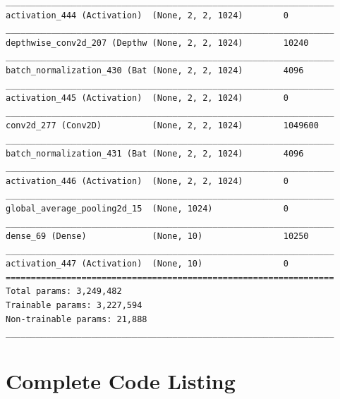 \documentclass{article}
\begin{document}
\begin{appendices}
\begin{lstlisting}
_________________________________________________________________
activation_444 (Activation)  (None, 2, 2, 1024)        0         
_________________________________________________________________
depthwise_conv2d_207 (Depthw (None, 2, 2, 1024)        10240     
_________________________________________________________________
batch_normalization_430 (Bat (None, 2, 2, 1024)        4096      
_________________________________________________________________
activation_445 (Activation)  (None, 2, 2, 1024)        0         
_________________________________________________________________
conv2d_277 (Conv2D)          (None, 2, 2, 1024)        1049600   
_________________________________________________________________
batch_normalization_431 (Bat (None, 2, 2, 1024)        4096      
_________________________________________________________________
activation_446 (Activation)  (None, 2, 2, 1024)        0         
_________________________________________________________________
global_average_pooling2d_15  (None, 1024)              0         
_________________________________________________________________
dense_69 (Dense)             (None, 10)                10250     
_________________________________________________________________
activation_447 (Activation)  (None, 10)                0         
=================================================================
Total params: 3,249,482
Trainable params: 3,227,594
Non-trainable params: 21,888
_________________________________________________________________
\end{lstlisting}
\section{Complete Code Listing} \label{codelist}
% 
\end{appendices}
\end{document}
